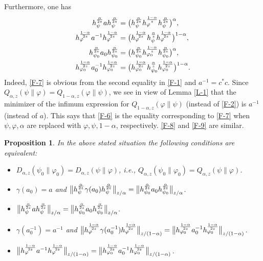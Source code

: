 \documentclass[11pt,reqno]{article}
\newtheorem{prop}[thm]{Proposition}
\numberwithin{equation}{section}
\def\ffi{\varphi}
\begin{document}
Furthermore, one has
\begin{align}
h_\psi^{\alpha\over2z}ah_\psi^{\alpha\over2z}
&=\bigl(h_\psi^{\alpha\over2z}h_\ffi^{1-\alpha\over z}h_\psi^{\alpha\over2z}\bigr)^\alpha,
\label{F-6}\\
h_\ffi^{1-\alpha\over2z}a^{-1}h_\ffi^{1-\alpha\over2z}
&=\bigl(h_\ffi^{1-\alpha\over2z}h_\psi^{\alpha\over z}h_\ffi^{1-\alpha\over2z}\bigr)^{1-\alpha},
\label{F-7}\\
h_{\psi_0}^{\alpha\over2z}a_0h_{\psi_0}^{\alpha\over2z}
&=\bigl(h_{\psi_0}^{\alpha\over2z}h_{\ffi_0}^{1-\alpha\over z}h_{\psi_0}^{\alpha\over2z}\bigr)^\alpha,
\label{F-8}\\
h_{\ffi_0}^{1-\alpha\over2z}a_0^{-1}h_{\ffi_0}^{1-\alpha\over2z}
&=\bigl(h_{\ffi_0}^{1-\alpha\over2z}h_{\psi_0}^{\alpha\over z}h_{\ffi_0}^{1-\alpha\over2z}\bigr)^{1-\alpha}.
\label{F-9}
\end{align}
Indeed, \eqref{F-7} is obvious from the second equality in \eqref{F-1} and $a^{-1}=c^*c$. Since
$Q_{\alpha,z}(\psi\|\ffi)=Q_{1-\alpha,z}(\ffi\|\psi)$, we see in view of Lemma \ref{L-1} that the minimizer of the
infimum expression for $Q_{1-\alpha,z}(\ffi\|\psi)$ (instead of \eqref{F-2}) is $a^{-1}$ (instead of $a$). This
says that \eqref{F-6} is the equality corresponding to \eqref{F-7} when $\psi,\ffi,\alpha$ are replaced with
$\ffi,\psi,1-\alpha$, respectively. \eqref{F-8} and \eqref{F-9} are similar.

\begin{prop}\label{P-2}
In the above stated situation the following conditions are equivalent:
\begin{itemize}
\item[(i)] $D_{\alpha,z}(\psi_0\|\ffi_0)=D_{\alpha,z}(\psi\|\ffi)$, i.e.,
$Q_{\alpha,z}(\psi_0\|\ffi_0)=Q_{\alpha,z}(\psi\|\ffi)$.
\item[(ii)] $\gamma(a_0)=a$ and
$\big\|h_\psi^{\alpha\over2z}\gamma(a_0)h_\psi^{\alpha\over2z}\big\|_{z/\alpha}
=\big\|h_{\psi_0}^{\alpha\over2z}a_0h_{\psi_0}^{\alpha\over2z}\big\|_{z/\alpha}$.
\item[(iii)] $\big\|h_\psi^{\alpha\over2z}ah_\psi^{\alpha\over2z}\big\|_{z/\alpha}
=\big\|h_{\psi_0}^{\alpha\over2z}a_0h_{\psi_0}^{\alpha\over2z}\big\|_{z/\alpha}$.
\item[(iv)] $\gamma(a_0^{-1})=a^{-1}$ and
$\big\|h_\ffi^{1-\alpha\over2z}\gamma(a_0^{-1})h_\ffi^{1-\alpha\over2z}\big\|_{z/(1-\alpha)}
=\big\|h_{\ffi_0}^{1-\alpha\over2z}a_0^{-1}h_{\ffi_0}^{1-\alpha\over2z}\big\|_{z/(1-\alpha)}$.
\item[(v)] $\big\|h_\ffi^{1-\alpha\over2z}a^{-1}h_\ffi^{1-\alpha\over2z}\big\|_{z/(1-\alpha)}
=\big\|h_{\ffi_0}^{1-\alpha\over2z}a_0^{-1}h_{\ffi_0}^{1-\alpha\over2z}\big\|_{z/(1-\alpha)}$.
\end{itemize}
\end{prop}
\end{document}
